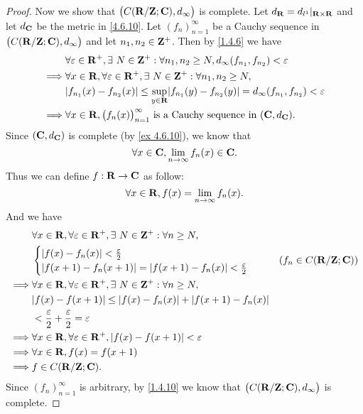 \begin{proof}
  Now we show that \(\big(C(\mathbf{R} / \mathbf{Z} ; \mathbf{C}), d_\infty\big)\) is complete.
  Let \(d_{\mathbf{R}} = d_{l^1}|_{\mathbf{R} \times \mathbf{R}}\) and let \(d_{\mathbf{C}}\) be the metric in \cref{4.6.10}.
  Let \((f_n)_{n = 1}^\infty\) be a Cauchy sequence in \(\big(C(\mathbf{R} / \mathbf{Z} ; \mathbf{C}), d_\infty\big)\) and let \(n_1, n_2 \in \mathbf{Z}^+\).
  Then by \cref{1.4.6} we have
  \begin{align*}
             & \forall \varepsilon \in \R^+, \exists\ N \in \Z^+ : \forall n_1, n_2 \geq N, d_\infty(f_{n_1}, f_{n_2}) < \varepsilon       \\
    \implies & \forall x \in \R, \forall \varepsilon \in \R^+, \exists\ N \in \Z^+ : \forall n_1, n_2 \geq N,                              \\
             & \abs{f_{n_1}(x) - f_{n_2}(x)} \leq \sup_{y \in \R} \abs{f_{n_1}(y) - f_{n_2}(y)} = d_\infty(f_{n_1}, f_{n_2}) < \varepsilon \\
    \implies & \forall x \in \R, \big(f_n(x)\big)_{n = 1}^\infty \text{ is a Cauchy sequence in } (\C, d_{\C}).
  \end{align*}
  Since \((\mathbf{C}, d_{\mathbf{C}})\) is complete (by \cref{ex 4.6.10}), we know that
  \[
    \forall x \in \mathbf{C}, \lim_{n \to \infty} f_n(x) \in \mathbf{C}.
  \]
  Thus we can define \(f : \mathbf{R} \to \mathbf{C}\) as follow:
  \[
    \forall x \in \mathbf{R}, f(x) = \lim_{n \to \infty} f_n(x).
  \]
  And we have
  \begin{align*}
             & \forall x \in \R, \forall \varepsilon \in \R^+, \exists\ N \in \Z^+ : \forall n \geq N, \\
             & \begin{cases}
                 \abs{f(x) - f_n(x)} < \frac{\varepsilon}{2} \\
                 \abs{f(x + 1) - f_n(x + 1)} = \abs{f(x + 1) - f_n(x)} < \frac{\varepsilon}{2}
               \end{cases}           & (f_n \in C(\R / \Z ; \C))            \\
    \implies & \forall x \in \R, \forall \varepsilon \in \R^+, \exists\ N \in \Z^+ : \forall n \geq N, \\
             & \abs{f(x) - f(x + 1)} \leq \abs{f(x) - f_n(x)} + \abs{f(x + 1) - f_n(x)}                \\
             & < \frac{\varepsilon}{2} + \frac{\varepsilon}{2} = \varepsilon                           \\
    \implies & \forall x \in \R, \forall \varepsilon \in \R^+, \abs{f(x) - f(x + 1)} < \varepsilon     \\
    \implies & \forall x \in \R, f(x) = f(x + 1)                                                       \\
    \implies & f \in C(\R / \Z ; \C).
  \end{align*}
  Since \((f_n)_{n = 1}^\infty\) is arbitrary, by \cref{1.4.10} we know that \(\big(C(\mathbf{R} / \mathbf{Z} ; \mathbf{C}), d_\infty\big)\) is complete.
\end{proof}